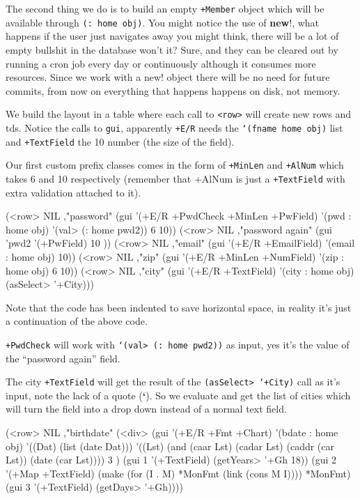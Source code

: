 The second thing we do is to build an empty \texttt{+Member} object
which will be available through \texttt{(: home obj)}. You might
notice the use of \textbf{new}!, what happens if the user just
navigates away you might think, there will be a lot of empty bullshit
in the database won't it? Sure, and they can be cleared out by running
a cron job every day or continuously although it consumes more
resources. Since we work with a new! object there will be no need for
future commits, from now on everything that happens happens on disk,
not memory.

We build the layout in a table where each call to
\texttt{\textless{}row\textgreater{}} will create new rows and tds.
Notice the calls to \texttt{gui}, apparently \texttt{+E/R} needs the
\texttt{‘(fname home obj)} list and \texttt{+TextField} the 10 number
(the size of the field).

Our first custom prefix classes comes in the form of \texttt{+MinLen}
and \texttt{+AlNum} which takes 6 and 10 respectively (remember that
+AlNum is just a \texttt{+TextField} with extra validation attached to
it).

\begin{wideverbatim}
(<row> NIL ,"password"       
   (gui 
      '(+E/R +PwdCheck +MinLen +PwField) 
      '(pwd : home obj) 
      '(val> (: home pwd2)) 6 10))
(<row> NIL ,"password again" (gui 'pwd2 '(+PwField) 10 ))
(<row> NIL ,"email" (gui '(+E/R +EmailField)       '(email : home obj) 10))
(<row> NIL ,"zip"   (gui '(+E/R +MinLen +NumField) '(zip : home obj) 6 10))
(<row> NIL ,"city"  (gui '(+E/R +TextField)        '(city : home obj) (asSelect> '+City)))
\end{wideverbatim}

Note that the code has been indented to save horizontal space, in
reality it's just a continuation of the above code.

\texttt{+PwdCheck} will work with \texttt{‘(val> (: home pwd2))} as
input, yes it's the value of the ``password again'' field.

The city \texttt{+TextField} will get the result of the \texttt{(asSelect>
‘+City)} call as it's input, note the lack of a quote (\textbf{‘}). So
we evaluate and get the list of cities which will turn the field into
a drop down instead of a normal text field.

\begin{wideverbatim}
(<row> NIL ,"birthdate" 
   (<div> 
      (gui '(+E/R +Fmt +Chart) '(bdate : home obj)
         '((Dat) (list (date Dat)))
         '((Lst) (and (caar Lst) (cadar Lst) (caddr (car Lst)) (date (car Lst))))
         3 )
      (gui 1 '(+TextField) (getYears> '+Gh 18))
      (gui 2 '(+Map +TextField)
         (make 
            (for (I . M) *MonFmt 
               (link (cons M I))))
         *MonFmt)
      (gui 3 '(+TextField) (getDays> '+Gh))))
\end{wideverbatim}

